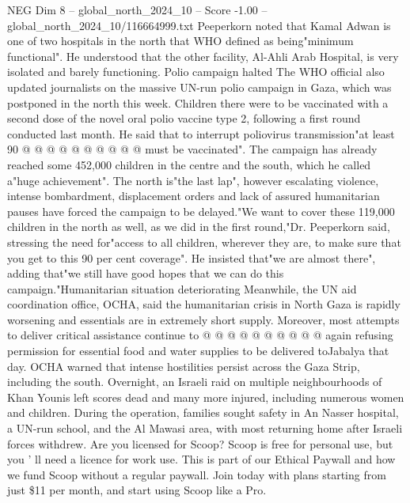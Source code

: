 \begin{textsample}{NEG Dim 8 – global\_north\_2024\_10 – Score -1.00 – global\_north\_2024\_10/116664999.txt}
Peeperkorn noted that Kamal Adwan is one of two hospitals in the north that WHO defined as being"minimum functional".
He understood that the other facility, Al-Ahli Arab Hospital, is very isolated and barely functioning.
Polio campaign halted The WHO official also updated journalists on the massive UN-run polio campaign in Gaza, which was postponed in the north this week.
Children there were to be vaccinated with a second dose of the novel oral polio vaccine type 2, following a first round conducted last month.
He said that to interrupt poliovirus transmission"at least 90 @ @ @ @ @ @ @ @ @ @ must be vaccinated".
The campaign has already reached some 452,000 children in the centre and the south, which he called a"huge achievement".
The north is"the last lap", however escalating violence, intense bombardment, displacement orders and lack of assured humanitarian pauses have forced the campaign to be delayed."We want to cover these 119,000 children in the north as well, as we did in the first round,"Dr.
Peeperkorn said, stressing the need for"access to all children, wherever they are, to make sure that you get to this 90 per cent coverage".
He insisted that"we are almost there", adding that"we still have good hopes that we can do this campaign."Humanitarian situation deteriorating Meanwhile, the UN aid coordination office, OCHA, said the humanitarian crisis in North Gaza is rapidly worsening and essentials are in extremely short supply.
Moreover, most attempts to deliver critical assistance continue to @ @ @ @ @ @ @ @ @ @ again refusing permission for essential food and water supplies to be delivered toJabalya that day.
OCHA warned that intense hostilities persist across the Gaza Strip, including the south.
Overnight, an Israeli raid on multiple neighbourhoods of Khan Younis left scores dead and many more injured, including numerous women and children.
During the operation, families sought safety in An Nasser hospital, a UN-run school, and the Al Mawasi area, with most returning home after Israeli forces withdrew.
Are you licensed for Scoop?
Scoop is free for personal use, but you ' ll need a licence for work use.
This is part of our Ethical Paywall and how we fund Scoop without a regular paywall.
Join today with plans starting from just \$11 per month, and start using Scoop like a Pro.

\end{textsample}
